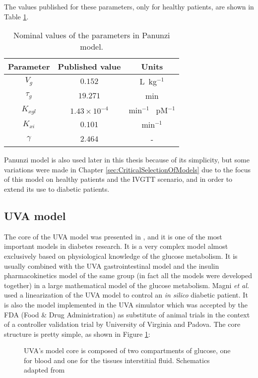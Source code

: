 The values published for these parameters, only for healthy patients, are shown in Table \ref{tab:panunzi}.

\begin{table}[hbtp]
	\centering
		\begin{tabular}{|c c c|}
		\hline 
		Parameter & Published value & Units \\
		\hline 
		$V_{g}$ & $0.152$ & L\ kg$^{-1}$ \\
		$\tau_{g}$ & $19.271$ & min \\
		$K_{xgl}$ & $1.43\times 10^{-4}$ & min$^{-1}$ \ pM$^{-1}$ \\
		$K_{xi}$ & $0.101$ & min$^{-1}$ \\
		$\gamma$ & $2.464$ & - \\
		\hline
		\end{tabular}
	\caption{Nominal values of the parameters in Panunzi model.}
	\label{tab:panunzi}
\end{table}

Panunzi model is also used later in this thesis because of its simplicity, but some variations were made in Chapter \ref{sec:CriticalSelectionOfModels} due to the focus of this model on healthy patients and the IVGTT scenario, and in order to extend its use to diabetic patients.

\subsection{UVA model}
\label{sec:CobelliEtAl}

The core of the UVA model was presented in \cite{man2007meal}, and it is one of the most important models in diabetes research. It is a very complex model almost exclusively based on physiological knowledge of the glucose metabolism. It is usually combined with the UVA gastrointestinal model and the insulin pharmacokinetics model of the same group (in fact all the models were developed together) in a large mathematical model of the glucose metabolism. Magni \textit{et al.} \cite{magni2007model} used a linearization of the UVA model to control an \textit{in silico} diabetic patient. It is also the model implemented in the UVA simulator \cite{kovatchev2009biosimulation} which was accepted by the FDA (Food \& Drug Administration) as substitute of animal trials in the context of a controller validation trial by University of Virginia and Padova. The core structure is pretty simple, as shown in Figure \ref{fig:cobelliendo}:

\begin{figure}[hbtp]
\centering
{}\caption{UVA's model core is composed of two compartments of glucose, one for blood and one for the tissues interstitial fluid. Schematics adapted from \cite{man2007meal}}
\label{fig:cobelliendo}
\end{figure}

